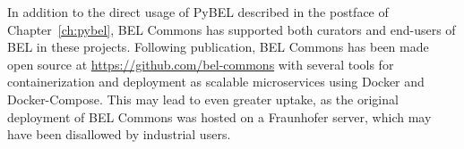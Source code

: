 In addition to the direct usage of PyBEL described in the postface of Chapter~\ref{ch:pybel}, BEL Commons has supported both curators and end-users of BEL in these projects.
Following publication, BEL Commons has been made open source at \url{https://github.com/bel-commons} with several tools for containerization and deployment as scalable microservices using Docker and Docker-Compose.
This may lead to even greater uptake, as the original deployment of BEL Commons was hosted on a Fraunhofer server, which may have been disallowed by industrial users.
